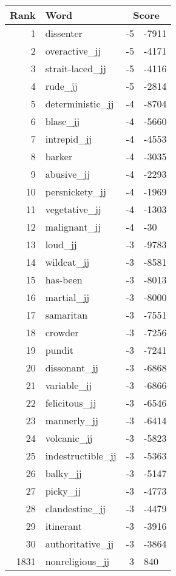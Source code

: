 \begin{longtable}[!htbp]{| rlr@{.}l |}
    \hline
    \textbf{Rank} & \textbf{Word} & \multicolumn{2}{c|}{\textbf{Score}} \\
    \hline
    \endhead
    1 & dissenter & -5 & -7911 \\
    2 & overactive\_jj & -5 & -4171 \\
    3 & strait-laced\_jj & -5 & -4116 \\
    4 & rude\_jj & -5 & -2814 \\
    5 & deterministic\_jj & -4 & -8704 \\
    6 & blase\_jj & -4 & -5660 \\
    7 & intrepid\_jj & -4 & -4553 \\
    8 & barker & -4 & -3035 \\
    9 & abusive\_jj & -4 & -2293 \\
    10 & persnickety\_jj & -4 & -1969 \\
    11 & vegetative\_jj & -4 & -1303 \\
    12 & malignant\_jj & -4 & -30 \\
    13 & loud\_jj & -3 & -9783 \\
    14 & wildcat\_jj & -3 & -8581 \\
    15 & has-been & -3 & -8013 \\
    16 & martial\_jj & -3 & -8000 \\
    17 & samaritan & -3 & -7551 \\
    18 & crowder & -3 & -7256 \\
    19 & pundit & -3 & -7241 \\
    20 & dissonant\_jj & -3 & -6868 \\
    21 & variable\_jj & -3 & -6866 \\
    22 & felicitous\_jj & -3 & -6546 \\
    23 & mannerly\_jj & -3 & -6414 \\
    24 & volcanic\_jj & -3 & -5823 \\
    25 & indestructible\_jj & -3 & -5363 \\
    26 & balky\_jj & -3 & -5147 \\
    27 & picky\_jj & -3 & -4773 \\
    28 & clandestine\_jj & -3 & -4479 \\
    29 & itinerant & -3 & -3916 \\
    30 & authoritative\_jj & -3 & -3864 \\
    1831 & nonreligious\_jj & 3 & 840 \\

\end{longtable}
